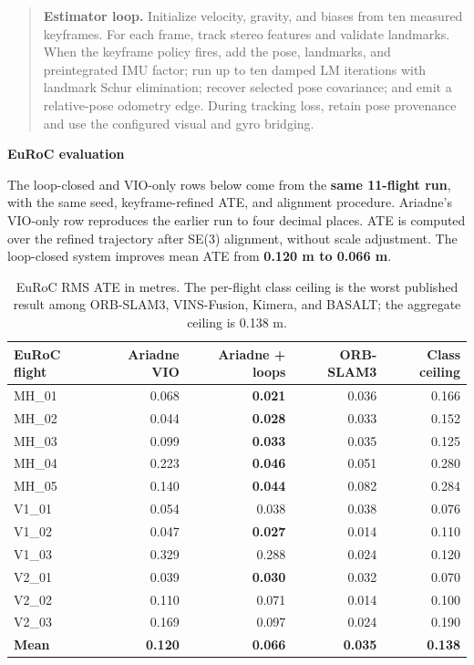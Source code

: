 \documentclass[10pt,a4paper]{article}
\newcommand{\indentedheading}[1]{\par\addvspace{0.65em}\noindent\hspace*{1em}\textbf{#1}\par\smallskip}
\begin{document}
\begin{quote}\small
\textbf{Estimator loop.} Initialize velocity, gravity, and biases from ten measured keyframes. For each frame, track stereo features and validate landmarks. When the keyframe policy fires, add the pose, landmarks, and preintegrated IMU factor; run up to ten damped LM iterations with landmark Schur elimination; recover selected pose covariance; and emit a relative-pose odometry edge. During tracking loss, retain pose provenance and use the configured visual and gyro bridging.
\end{quote}

\indentedheading{EuRoC evaluation}

The loop-closed and VIO-only rows below come from the \textbf{same 11-flight run}, with the same seed, keyframe-refined ATE, and alignment procedure. Ariadne's VIO-only row reproduces the earlier run to four decimal places. ATE is computed over the refined trajectory after SE(3) alignment, without scale adjustment. The loop-closed system improves mean ATE from \textbf{0.120 m to 0.066 m}.

\begin{table}[ht]
\centering
\small
\begin{tabular}{@{}lrrrr@{}}
\toprule
\textbf{EuRoC flight} & \textbf{Ariadne VIO} & \textbf{Ariadne + loops} & \textbf{ORB-SLAM3} & \textbf{Class ceiling} \\
\midrule
MH\_01 & 0.068 & \textbf{0.021} & 0.036 & 0.166 \\
MH\_02 & 0.044 & \textbf{0.028} & 0.033 & 0.152 \\
MH\_03 & 0.099 & \textbf{0.033} & 0.035 & 0.125 \\
MH\_04 & 0.223 & \textbf{0.046} & 0.051 & 0.280 \\
MH\_05 & 0.140 & \textbf{0.044} & 0.082 & 0.284 \\
V1\_01 & 0.054 & 0.038 & 0.038 & 0.076 \\
V1\_02 & 0.047 & \textbf{0.027} & 0.014 & 0.110 \\
V1\_03 & 0.329 & 0.288 & 0.024 & 0.120 \\
V2\_01 & 0.039 & \textbf{0.030} & 0.032 & 0.070 \\
V2\_02 & 0.110 & 0.071 & 0.014 & 0.100 \\
V2\_03 & 0.169 & 0.097 & 0.024 & 0.190 \\
\midrule
\textbf{Mean} & \textbf{0.120} & \textbf{0.066} & \textbf{0.035} & \textbf{0.138} \\
\bottomrule
\end{tabular}
\caption{EuRoC RMS ATE in metres. The per-flight class ceiling is the worst published result among ORB-SLAM3, VINS-Fusion, Kimera, and BASALT; the aggregate ceiling is 0.138 m.}
\label{tab:vio-euroc}
\end{table}
\end{document}

